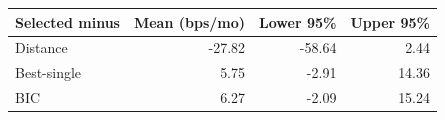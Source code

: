 \begin{tabular}{@{}lrrr@{}}
\toprule
Selected minus & Mean (bps/mo) & Lower 95\% & Upper 95\% \\
\midrule
Distance & -27.82 & -58.64 & 2.44 \\
Best-single & 5.75 & -2.91 & 14.36 \\
BIC & 6.27 & -2.09 & 15.24 \\
\bottomrule
\end{tabular}
